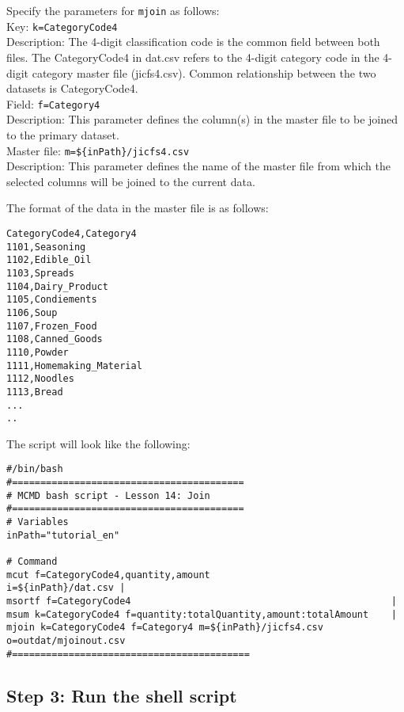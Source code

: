 {\setlength{\parindent}{0cm}

Specify the parameters for \verb|mjoin| as follows: \\

Key: 			\verb|k=CategoryCode4| \\
Description: 	 The 4-digit classification code is the common field between both files. The CategoryCode4 in dat.csv refers to the 4-digit category code in the 4-digit category master file (jicfs4.csv). Common relationship between the two datasets is CategoryCode4. \\

Field: 		\verb|f=Category4| \\ 
Description: 	This parameter defines the column(s) in the master file to be joined to the primary dataset. \\

Master file: 	\verb|m=${inPath}/jicfs4.csv | \\ 
Description:	This parameter defines the name of the master file from which the selected columns will be joined to the current data. 

The format of the data in the master file is as follows:  \\ 

\begin{verbatim}
CategoryCode4,Category4
1101,Seasoning
1102,Edible_Oil
1103,Spreads
1104,Dairy_Product
1105,Condiements
1106,Soup
1107,Frozen_Food
1108,Canned_Goods
1110,Powder
1111,Homemaking_Material
1112,Noodles
1113,Bread
...
..
\end{verbatim}
}

The script will look like the following: \\

\begin{verbatim}
#/bin/bash
#=========================================
# MCMD bash script - Lesson 14: Join 
#=========================================
# Variables
inPath="tutorial_en"

# Command 
mcut f=CategoryCode4,quantity,amount                i=${inPath}/dat.csv | 
msortf f=CategoryCode4                                              |
msum k=CategoryCode4 f=quantity:totalQuantity,amount:totalAmount    |
mjoin k=CategoryCode4 f=Category4 m=${inPath}/jicfs4.csv         o=outdat/mjoinout.csv
#==========================================
\end{verbatim}

 \subsection{Step 3: Run the shell script}
 
